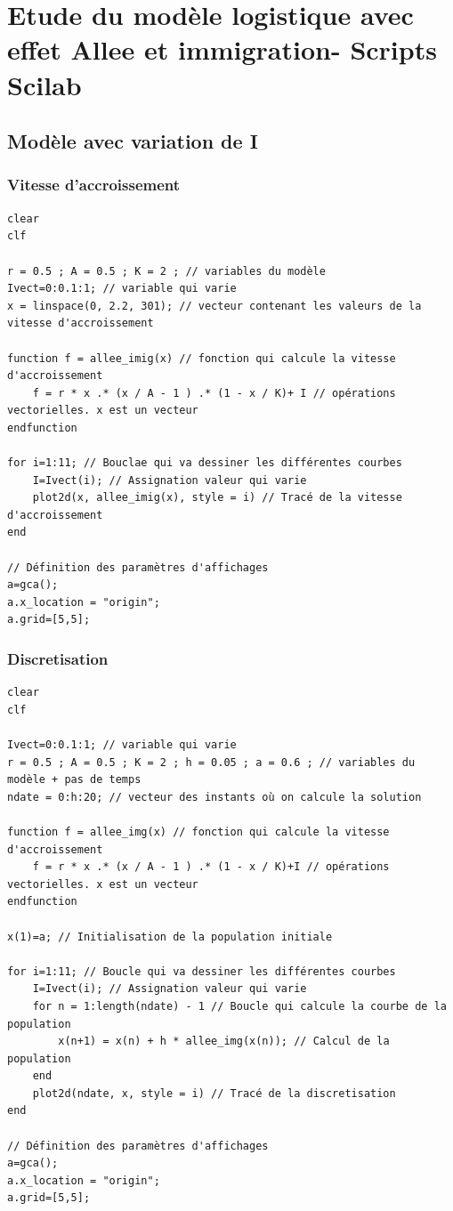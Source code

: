 \documentclass{article}
\begin{document}
\newpage
\appendix

\section{Etude du modèle logistique avec effet Allee et immigration- Scripts Scilab}

\subsection{Modèle avec variation de I}

\subsubsection{Vitesse d'accroissement}

\begin{verbatim}
clear
clf

r = 0.5 ; A = 0.5 ; K = 2 ; // variables du modèle
Ivect=0:0.1:1; // variable qui varie
x = linspace(0, 2.2, 301); // vecteur contenant les valeurs de la vitesse d'accroissement

function f = allee_imig(x) // fonction qui calcule la vitesse d'accroissement
    f = r * x .* (x / A - 1 ) .* (1 - x / K)+ I // opérations vectorielles. x est un vecteur
endfunction

for i=1:11; // Bouclae qui va dessiner les différentes courbes
    I=Ivect(i); // Assignation valeur qui varie
    plot2d(x, allee_imig(x), style = i) // Tracé de la vitesse d'accroissement
end

// Définition des paramètres d'affichages
a=gca();
a.x_location = "origin";
a.grid=[5,5];
\end{verbatim}

\subsubsection{Discretisation}

\begin{verbatim}
clear
clf

Ivect=0:0.1:1; // variable qui varie
r = 0.5 ; A = 0.5 ; K = 2 ; h = 0.05 ; a = 0.6 ; // variables du modèle + pas de temps
ndate = 0:h:20; // vecteur des instants où on calcule la solution

function f = allee_img(x) // fonction qui calcule la vitesse d'accroissement
    f = r * x .* (x / A - 1 ) .* (1 - x / K)+I // opérations vectorielles. x est un vecteur
endfunction

x(1)=a; // Initialisation de la population initiale

for i=1:11; // Boucle qui va dessiner les différentes courbes
    I=Ivect(i); // Assignation valeur qui varie
    for n = 1:length(ndate) - 1 // Boucle qui calcule la courbe de la population
        x(n+1) = x(n) + h * allee_img(x(n)); // Calcul de la population
    end 
    plot2d(ndate, x, style = i) // Tracé de la discretisation
end

// Définition des paramètres d'affichages
a=gca();
a.x_location = "origin";
a.grid=[5,5];
\end{verbatim}
\end{document}

